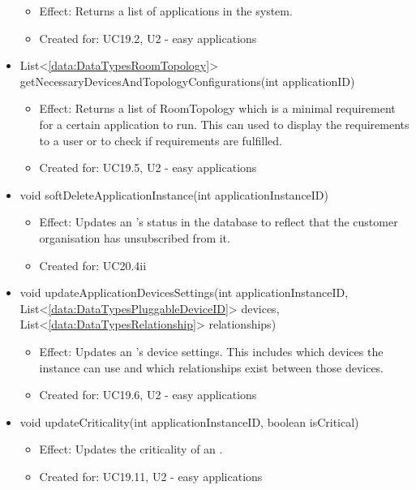 \begin{description}
\begin{itemize}[noitemsep,nolistsep,leftmargin=-.25cm]
\begin{itemize}[noitemsep,nolistsep]
           \item Effect: Returns a list of applications in the system.
\item Created for: UC19.2, U2 - easy applications
        \end{itemize}
      \item \textsf{List\textless{}\ref{data:DataTypesRoomTopology}\textgreater{} getNecessaryDevicesAndTopologyConfigurations(int applicationID)}
        \begin{itemize}[noitemsep,nolistsep]
           \item Effect: Returns a list of RoomTopology which is a minimal requirement for a certain application to run. This can used to display the requirements to a user or to check if requirements are fulfilled.
\item Created for: UC19.5, U2 - easy applications
        \end{itemize}
      \item \textsf{void softDeleteApplicationInstance(int applicationInstanceID)}
        \begin{itemize}[noitemsep,nolistsep]
           \item Effect: Updates an 's status in the database to reflect that the customer organisation has unsubscribed from it.
\item Created for: UC20.4ii
        \end{itemize}
      \item \textsf{void updateApplicationDevicesSettings(int applicationInstanceID, List\textless{}\ref{data:DataTypesPluggableDeviceID}\textgreater{} devices, List\textless{}\ref{data:DataTypesRelationship}\textgreater{} relationships)}
        \begin{itemize}[noitemsep,nolistsep]
           \item Effect: Updates an 's device settings. This includes which devices the instance can use and which relationships exist between those devices.
\item Created for: UC19.6, U2 - easy applications
        \end{itemize}
      \item \textsf{void updateCriticality(int applicationInstanceID, boolean isCritical)}
        \begin{itemize}[noitemsep,nolistsep]
           \item Effect: Updates the criticality of an .
\item Created for: UC19.11, U2 - easy applications
        \end{itemize}
    \end{itemize}
    \end{description}

